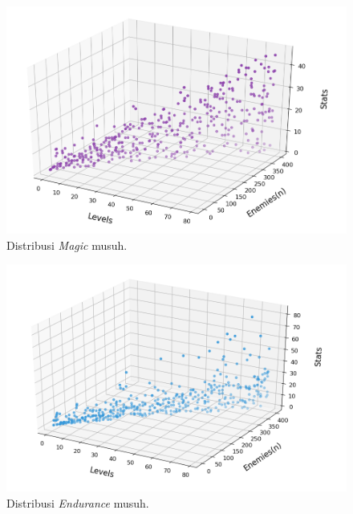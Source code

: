 \begin{figure} [!h] \centering
	\includegraphics[scale=0.58]{img/EnemyMagicDistrib.png}
	\caption{Distribusi \textit{Magic} musuh.}
	\label{fig:enemy_mag_distrib}
	\vspace{2ex}
\end{figure}

\begin{figure} [!h] \centering
	\includegraphics[scale=0.58]{img/EnemyEnduranceDistrib.png}
	\caption{Distribusi \textit{Endurance} musuh.}
	\label{fig:enemy_endr_distrib}
\end{figure}

